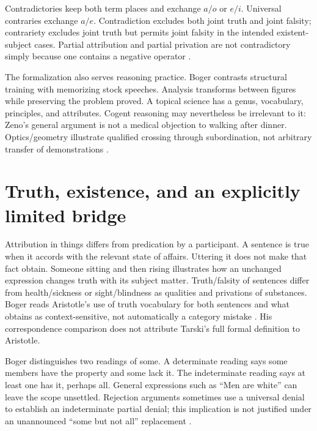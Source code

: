 Contradictories keep both term places and exchange \(a/o\) or \(e/i\).
Universal contraries exchange \(a/e\). Contradiction excludes both joint
truth and joint falsity; contrariety excludes joint truth but permits
joint falsity in the intended existent-subject cases.
Partial attribution and partial privation are not contradictory simply
because one contains a negative operator
\parencite[pp.~133--136, 155--157]{Boger2004UnderlyingLogic}.

The formalization also serves reasoning practice. Boger contrasts
structural training with memorizing stock speeches. Analysis transforms
between figures while preserving the problem proved. A topical science has
a genus, vocabulary, principles, and attributes. Cogent reasoning may
nevertheless be irrelevant to it: Zeno's general argument is not a medical
objection to walking after dinner. Optics/geometry illustrate qualified
crossing through subordination, not arbitrary transfer of demonstrations
\parencite[pp.~136--142]{Boger2004UnderlyingLogic}.

\section{Truth, existence, and an explicitly limited bridge}
\label{sec:p13-boger-semantics}

Attribution in things differs from predication by a participant.
A sentence is true when it accords with the relevant state of affairs.
Uttering it does not make that fact obtain. Someone sitting and then rising
illustrates how an unchanged expression changes truth with its subject
matter. Truth/falsity of sentences differ from health/sickness or
sight/blindness as qualities and privations of substances.
Boger reads Aristotle's use of truth vocabulary for both sentences and
what obtains as context-sensitive, not automatically a category mistake
\parencite[pp.~144--157]{Boger2004UnderlyingLogic}.
His correspondence comparison does not attribute Tarski's full formal
definition to Aristotle.

Boger distinguishes two readings of some. A determinate reading says
some members have the property and some lack it. The indeterminate reading
says at least one has it, perhaps all. General expressions such as
\enquote{Men are white} can leave the scope unsettled. Rejection arguments
sometimes use a universal denial to establish an indeterminate partial
denial; this implication is not justified under an unannounced
\enquote{some but not all} replacement
\parencite[pp.~147--148]{Boger2004UnderlyingLogic}.

